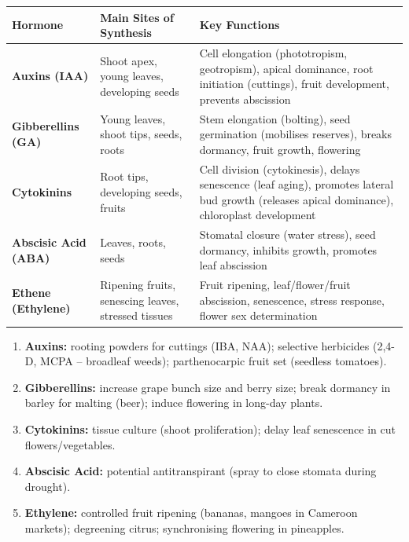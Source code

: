 \documentclass[11pt]{article}
\begin{document}
\begin{propriete}
\begin{center}
\begin{tabularx}{\linewidth}{|l|X|X|}
\hline
\rowcolor{popblueL} \textbf{Hormone} & \textbf{Main Sites of Synthesis} & \textbf{Key Functions} \\
\hline
\textbf{Auxins (IAA)} & Shoot apex, young leaves, developing seeds & Cell elongation (phototropism, geotropism), apical dominance, root initiation (cuttings), fruit development, prevents abscission \\
\hline
\textbf{Gibberellins (GA)} & Young leaves, shoot tips, seeds, roots & Stem elongation (bolting), seed germination (mobilises reserves), breaks dormancy, fruit growth, flowering \\
\hline
\textbf{Cytokinins} & Root tips, developing seeds, fruits & Cell division (cytokinesis), delays senescence (leaf aging), promotes lateral bud growth (releases apical dominance), chloroplast development \\
\hline
\textbf{Abscisic Acid (ABA)} & Leaves, roots, seeds & Stomatal closure (water stress), seed dormancy, inhibits growth, promotes leaf abscission \\
\hline
\textbf{Ethene (Ethylene)} & Ripening fruits, senescing leaves, stressed tissues & Fruit ripening, leaf/flower/fruit abscission, senescence, stress response, flower sex determination \\
\hline
\end{tabularx}
\end{center}
\end{propriete}

\begin{methode}
\begin{enumerate}
\item \textbf{Auxins:} rooting powders for cuttings (IBA, NAA); selective herbicides (2,4-D, MCPA -- broadleaf weeds); parthenocarpic fruit set (seedless tomatoes).
\item \textbf{Gibberellins:} increase grape bunch size and berry size; break dormancy in barley for malting (beer); induce flowering in long-day plants.
\item \textbf{Cytokinins:} tissue culture (shoot proliferation); delay leaf senescence in cut flowers/vegetables.
\item \textbf{Abscisic Acid:} potential antitranspirant (spray to close stomata during drought).
\item \textbf{Ethylene:} controlled fruit ripening (bananas, mangoes in Cameroon markets); degreening citrus; synchronising flowering in pineapples.
\end{enumerate}
\end{methode}
\end{document}

